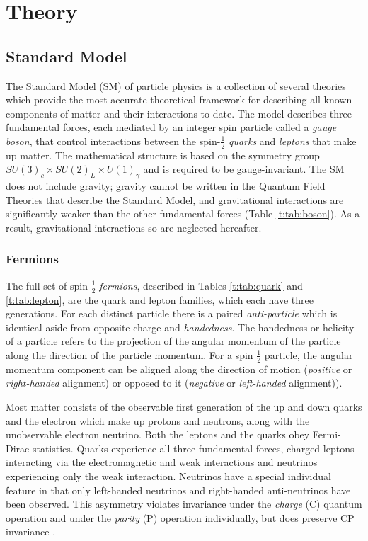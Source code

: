 \chapter{Theory}\label{c:Theory}

\section{Standard Model}


The Standard Model (SM) of particle physics is a collection of several theories which provide the most accurate theoretical framework for describing all known components of matter and their interactions to date. The model describes three fundamental forces, each mediated by an integer spin particle called a \textit{gauge boson}, that control interactions between the spin-$\frac{1}{2}$ \textit{quarks} and \textit{leptons} that make up matter. The mathematical structure is  based on the symmetry group $SU(3)_c\times SU(2)_L\times U(1)_\gamma$ and is required to be gauge-invariant. The SM does not include gravity; gravity cannot be written in the Quantum Field Theories that describe the Standard Model, and gravitational interactions are significantly weaker than the other fundamental forces (Table \ref{t:tab:boson}). As a result, gravitational interactions so are neglected hereafter.

	\subsection{Fermions}

		The full set of spin-$\frac{1}{2}$ \textit{fermions}, described in Tables \ref{t:tab:quark} and \ref{t:tab:lepton}, are the quark and lepton families, which each have three generations. For each distinct particle there is a paired \textit{anti-particle} which is identical aside from opposite charge and \textit{handedness}. The handedness or helicity of a particle refers to the projection of the angular momentum of the particle along the direction of the particle momentum. For a spin $\frac{1}{2}$ particle, the angular momentum component can be aligned along the direction of motion (\textit{positive} or \textit{right-handed} alignment) or opposed to it (\textit{negative} or \textit{left-handed} alignment)).

		Most matter consists of the observable first generation of the up and down quarks and the electron which make up protons and neutrons, along with the unobservable electron neutrino. Both the leptons and the quarks obey Fermi-Dirac statistics. Quarks experience all three fundamental forces, charged leptons interacting via the electromagnetic and weak interactions and neutrinos experiencing only the weak interaction. Neutrinos have a special individual feature in that only left-handed neutrinos and right-handed anti-neutrinos have been observed. This asymmetry violates invariance under the \textit{charge} (C) quantum operation and under the \textit{parity} (P) operation individually, but does preserve CP invariance \cite{martinshaw}.

